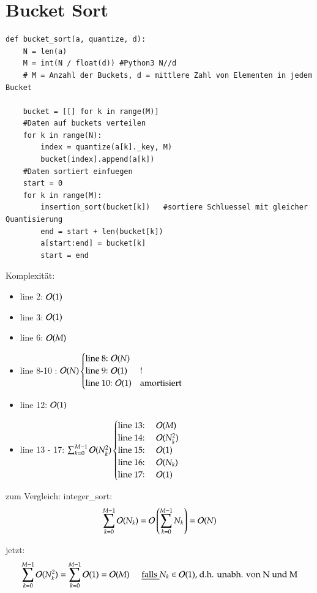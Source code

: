 \section{Bucket Sort}

\begin{verbatim}
def bucket_sort(a, quantize, d):
    N = len(a)
    M = int(N / float(d)) #Python3 N//d
    # M = Anzahl der Buckets, d = mittlere Zahl von Elementen in jedem Bucket

    bucket = [[] for k in range(M)]
    #Daten auf buckets verteilen
    for k in range(N):
        index = quantize(a[k]._key, M)
        bucket[index].append(a[k])
    #Daten sortiert einfuegen
    start = 0
    for k in range(M):
        insertion_sort(bucket[k])   #sortiere Schluessel mit gleicher Quantisierung
        end = start + len(bucket[k])
        a[start:end] = bucket[k]
        start = end
\end{verbatim}
Komplexität:
\begin{itemize}
    \item line 2: $\mathcal{O}{}(1)$
    \item line 3: $\mathcal{O}{}(1)$
    \item line 6: $\mathcal{O}{}(M)$
    \item line 8-10 : $\mathcal{O}{}(N) \begin{cases}\text{line 8: } \mathcal{O}{}(N) & \\ \text{line 9: } \mathcal{O}{}(1) & ! \\ \text{line 10: }  \mathcal{O}{}(1) & \text{amortisiert}\end{cases}$
    \item line 12: $\mathcal{O}{}(1)$
    \item line 13 - 17: $\sum_{k=0}^{M-1} \mathcal{O}{}(N_k^2) \begin{cases} \text{line 13: } & \mathcal{O}{}(M) \\ \text{line 14: } & \mathcal{O}{}(N_k^2) \\  \text{line 15: } & \mathcal{O}{}(1)  \\\text{line 16: } & \mathcal{O}{}(N_k) \\  \text{line 17: } & \mathcal{O}{}(1) \\ \end{cases}$
\end{itemize}
zum Vergleich: integer\_sort:
\[ \sum_{k=0}^{M-1} \mathcal{O}{}(N_k) = \mathcal{O}{}\left( \sum_{k=0}^{M-1} N_k\right) = \mathcal{O}{}(N)\]

jetzt:
\[ \sum_{k=0}^{M-1} \mathcal{O}{}(N_k^2) = \sum_{k=0}^{M-1} \mathcal{O}{}(1) = \mathcal{O}{}(M) \hspace*{0.5cm} \underline{\text{falls }} N_k \in \mathcal{O}{}(1) \text{, d.h. unabh. von N und M} \]

